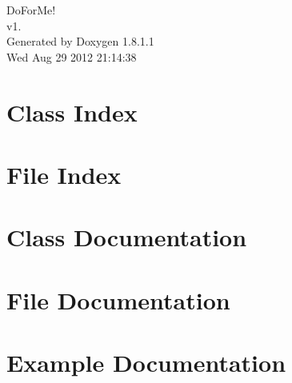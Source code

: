 \documentclass{book}
\begin{document}
\hypersetup{pageanchor=false,citecolor=blue}
\begin{titlepage}
\vspace*{7cm}
\begin{center}
{\Large Do\-For\-Me! \\[1ex]\large v1. }\\
\vspace*{1cm}
{\large Generated by Doxygen 1.8.1.1}\\
\vspace*{0.5cm}
{\small Wed Aug 29 2012 21:14:38}\\
\end{center}
\end{titlepage}
\clearemptydoublepage
{}
\tableofcontents
\clearemptydoublepage
{}
\hypersetup{pageanchor=true,citecolor=blue}
\chapter{Class Index}

\chapter{File Index}

\chapter{Class Documentation}
















\chapter{File Documentation}


































\chapter{Example Documentation}

\printindex
\end{document}
